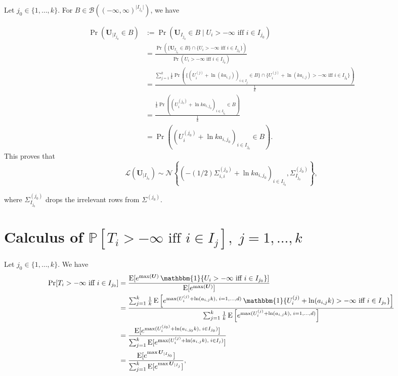 \documentclass[
]{article}
\begin{document}
Let \(j_0 \in \{1,\ldots,k\}\). For
\(B \in \mathcal{B}( (-\infty,\infty)^{\lvert I_{j_0} \rvert} )\), we
have

\[
\begin{aligned}
\Pr(\boldsymbol{U}_{\mid I_{j_0}}  \in B)
&:= \Pr(\boldsymbol{U}_{I_{j_0}} \in B \mid U_i>-\infty \text{ iff } i \in I_{j_0}  )\\
&=\frac{ \Pr(\{\boldsymbol{U}_{I_{j_0}} \in B\} \cap \{U_i>-\infty \text{ iff } i \in I_{j_0}\}    )  }{  \Pr(U_i>-\infty \text{ iff } i \in I_{j_0}) }\\
&=\frac{ \sum_{j=1}^k \tfrac{1}{k} \Pr\left( \{ (U_{i}^{(j)} +\ln(ka_{i,j}) )_{i \in I_j} \in B \} \cap \{U_{i}^{(j)}+\ln(k a_{i,j})>-\infty \text{ iff } i \in I_{j_0}\}  \right) }{ \frac{1}{k}   }\\
&=\frac{ \tfrac{1}{k} \Pr( (U_{i}^{(j_0)} +\ln ka_{i,j_0})_{i \in I_{j_0}} \in B ) }{ \frac{1}{k}   }\\
&= \Pr( (U_{i}^{(j_0)} +\ln ka_{i,j_0})_{i \in I_{j_0}} \in B ).
\end{aligned}
\] This proves that \begin{equation}
\mathcal{L}(\boldsymbol{U}_{\mid I_{j_0}}) \sim \mathcal{N}\left\{\left(-(1/2) \Sigma_{i,i}^{(j_0)} +\ln k  a_{i,j_0}\right)_{i \in I_{j_0}}, \Sigma^{(j_0)}_{I_{j_0}} \right\},
\label{equa:lawofU}
\end{equation}

where \(\Sigma^{(j_0)}_{I_{j_0}}\) drops the irrelevant rows from
\(\Sigma^{(j_0)}\).

\section{Calculus of $\mathbb{P}[T_i>-\infty \text{ iff } i \in I_j], \; j=1,\ldots,k$}

Let \(j_0 \in \{1,\ldots,k\}\). We have \[
\begin{aligned}
\Pr[T_i>-\infty \text{ iff } i \in I_{j_0} ]
&=\frac{\operatorname{E}[e^{\max (\boldsymbol{U})} \operatorname{\mathbbm{1}}\{U_i>-\infty \text{ iff } i \in I_{j_0}\} ]}{\operatorname{E}[e^{\max (\boldsymbol{U})} ]}\\
&=\frac{\sum_{j=1}^{k} \tfrac{1}{k} \operatorname{E}\left[ e^{\max(U_{i}^{(j)} +\ln (a_{i,j}k), \; i=1,\ldots,d )} \operatorname{\mathbbm{1}}\{U_{i}^{(j)}+\ln (a_{i,j}k) >-\infty \text{ iff }i \in I_{j_0}    \}  \right]}{\sum_{j=1}^{k} \tfrac{1}{k} \operatorname{E}\left[ e^{\max(U_{i}^{(j)} +\ln (a_{i,j}k), \; i=1,\ldots,d )}   \right]   }\\
&=\frac{ \operatorname{E}[e^{\max(U_{i}^{(j_0)} +\ln(a_{i,j_0} k), \; i \in I_{j_0} ) }] }{ \sum_{j=1}^{k} \operatorname{E}[e^{\max(U_{i}^{(j)} +\ln(a_{i,j} k), \; i \in I_{j} ) }] }\\
&=\frac{\operatorname{E}[e^{\max \boldsymbol{U}_{\mid I_{j_0}}}]}{ \sum_{j=1}^k \operatorname{E}[e^{\max \boldsymbol{U}_{\mid I_{j}}}] },
\end{aligned}
\]
\end{document}
